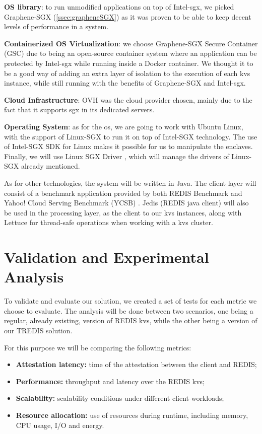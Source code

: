 \textbf{OS library}: to run unmodified applications on top of Intel-\gls{sgx}, we picked Graphene-SGX (\ref{ssec:grapheneSGX}) as it was proven to be able to keep decent levels of performance in a system.

\textbf{Containerized OS Virtualization}: we choose Graphene-SGX Secure Container (GSC) \cite{gsc} due to being an open-source container system where an application can be protected by Intel-\gls{sgx} while running inside a Docker \cite{docker} container. We thought it to be a good way of adding an extra layer of isolation to the execution of each \gls{kvs} instance, while still running with the benefits of Graphene-SGX and Intel-\gls{sgx}.

\textbf{Cloud Infrastructure}: OVH \cite{ovhCloud} was the cloud provider chosen, mainly due to the fact that it supports \gls{sgx} in its dedicated servers.

\textbf{Operating System}: as for the \gls{os}, we are going to work with Ubuntu Linux, with the support of Linux-SGX \cite{linuxSGXwebsite} to run it on top of Intel-SGX technology. The use of Intel-SGX SDK \cite{linuxSgxSDK} for Linux makes it possible for us to manipulate the enclaves. Finally, we will use Linux SGX Driver \cite{linuxSGXDrivers}, which will manage the drivers of Linux-SGX already mentioned.

As for other technologies, the system will be written in Java. 
The client layer will consist of a benchmark application provided by both REDIS Benchmark and Yahoo! Cloud Serving Benchmark (YCSB) \cite{ycsb}. 
Jedis (REDIS java client) \cite{jedis} will also be used in the processing layer, as the client to our \gls{kvs} instances, along with Lettuce \cite{lettuce} for thread-safe operations when working with a \gls{kvs} cluster.


\section{Validation and Experimental Analysis} %
\label{sec:floats_figures_and_captions}

To validate and evaluate our solution, we created a set of tests for each metric we choose to evaluate. The analysis will be done between two scenarios, one being a regular, already existing, version of REDIS \gls{kvs}, while the other being a version of our TREDIS solution.

For this purpose we will be comparing the following metrics:

\begin{itemize}
	\item \textbf{Attestation latency:} time of the attestation between the client and REDIS;
	\item \textbf{Performance:} throughput and latency over the REDIS \gls{kvs};
	\item \textbf{Scalability:} scalability conditions under different client-workloads;
	\item \textbf{Resource allocation:} use of resources during runtime, including memory, CPU usage, I/O and energy.
\end{itemize}

